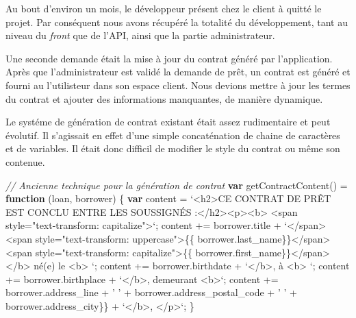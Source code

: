 \documentclass[12pt,a4paper]{article}
\newenvironment{Shaded}{}{}
\newcommand{\KeywordTok}[1]{\textcolor[rgb]{0.00,0.44,0.13}{\textbf{{#1}}}}
\newcommand{\StringTok}[1]{\textcolor[rgb]{0.25,0.44,0.63}{{#1}}}
\newcommand{\VerbatimStringTok}[1]{\textcolor[rgb]{0.25,0.44,0.63}{{#1}}}
\newcommand{\CommentTok}[1]{\textcolor[rgb]{0.38,0.63,0.69}{\textit{{#1}}}}
\newcommand{\VariableTok}[1]{\textcolor[rgb]{0.10,0.09,0.49}{{#1}}}
\newcommand{\OperatorTok}[1]{\textcolor[rgb]{0.40,0.40,0.40}{{#1}}}
\newcommand{\AttributeTok}[1]{\textcolor[rgb]{0.49,0.56,0.16}{{#1}}}
\newcommand{\NormalTok}[1]{{#1}}
\begin{document}
  Au bout d'environ un mois, le développeur présent chez le client à
  quitté le projet. Par conséquent nous avons récupéré la totalité du
  développement, tant au niveau du \emph{front} que de l'API, ainsi que la
  partie administrateur.

  \bigskip

  Une seconde demande était la mise à jour du contrat généré par
  l'application. Après que l'administrateur est validé la demande de prêt,
  un contrat est généré et fourni au l'utilisteur dans son espace client.
  Nous devions mettre à jour les termes du contrat et ajouter des
  informations manquantes, de manière dynamique.

  \bigskip

  Le systéme de génération de contrat existant était assez rudimentaire et
  peut évolutif. Il s'agissait en effet d'une simple concaténation de
  chaine de caractères et de variables. Il était donc difficil de modifier
  le style du contrat ou même son contenue.

  \begin{Shaded}
  \begin{Highlighting}[]
  \CommentTok{// Ancienne technique pour la génération de contrat}
  \KeywordTok{var} \AttributeTok{getContractContent}\NormalTok{() }\OperatorTok{=} \KeywordTok{function} \NormalTok{(loan}\OperatorTok{,} \NormalTok{borrower) }\OperatorTok{\{}
    \KeywordTok{var} \NormalTok{content }\OperatorTok{=} \VerbatimStringTok{`<h2>CE CONTRAT DE PRÊT EST CONCLU}
  \VerbatimStringTok{    ENTRE LES SOUSSIGNÉS :</h2><p><b>}
  \VerbatimStringTok{    <span style="text-transform: capitalize">`}\OperatorTok{;}
    \NormalTok{content }\OperatorTok{+=} \VariableTok{borrower}\NormalTok{.}\AttributeTok{title} \OperatorTok{+} \VerbatimStringTok{`</span>}
  \VerbatimStringTok{   <span style="text-transform: uppercase">\{\{ borrower.last_name\}\}</span>}
  \VerbatimStringTok{   <span style="text-transform: capitalize">\{\{ borrower.first_name\}\}</span>}
  \VerbatimStringTok{    </b> né(e) le <b> `}\OperatorTok{;}
    \NormalTok{content }\OperatorTok{+=} \VariableTok{borrower}\NormalTok{.}\AttributeTok{birthdate} \OperatorTok{+} \VerbatimStringTok{`</b>, à <b> `}\OperatorTok{;}
    \NormalTok{content }\OperatorTok{+=} \VariableTok{borrower}\NormalTok{.}\AttributeTok{birthplace} \OperatorTok{+} \VerbatimStringTok{`</b>, demeurant <b>`}\OperatorTok{;}
    \NormalTok{content }\OperatorTok{+=} \VariableTok{borrower}\NormalTok{.}\AttributeTok{address_line} \OperatorTok{+} \StringTok{' '}
      \OperatorTok{+} \VariableTok{borrower}\NormalTok{.}\AttributeTok{address_postal_code} \OperatorTok{+} \StringTok{' '}
      \OperatorTok{+}  \VariableTok{borrower}\NormalTok{.}\AttributeTok{address_city}\OperatorTok{\}}\NormalTok{\} }\OperatorTok{+} \VerbatimStringTok{`</b>, </p>`}\OperatorTok{;}
  \NormalTok{\}}
  \end{Highlighting}
  \end{Shaded}
\end{document}
